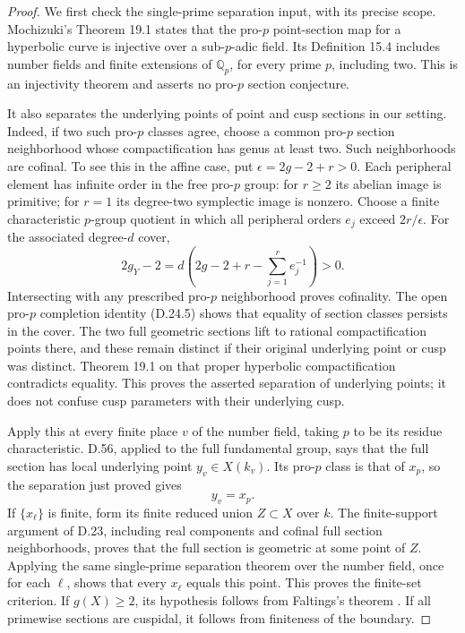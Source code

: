 \begin{proof}
We first check the single-prime separation
input, with its precise scope. Mochizuki's
Theorem 19.1 \cite{DE_Mochizuki1999} states
that the pro-\(p\) point-section map for a
hyperbolic curve is injective over a
sub-\(p\)-adic field. Its Definition 15.4
includes number fields and finite extensions
of \(\mathbb Q_p\), for every prime \(p\),
including two. This is an injectivity
theorem and asserts no pro-\(p\) section
conjecture.

It also separates the underlying points
of point and cusp sections in our setting.
Indeed, if two such pro-\(p\) classes agree,
choose a common pro-\(p\) section neighborhood
whose compactification has genus at least
two. Such neighborhoods are cofinal. To
see this in the affine case, put
\(\epsilon=2g-2+r>0\). Each peripheral
element has infinite order in the free
pro-\(p\) group: for \(r\ge2\) its
abelian image is primitive; for \(r=1\)
its degree-two symplectic image is nonzero.
Choose a finite characteristic \(p\)-group
quotient in which all peripheral orders
\(e_j\) exceed \(2r/\epsilon\). For the
associated degree-\(d\) cover,
\[
 2g_Y-2=d\left(2g-2+r-\sum_{j=1}^r e_j^{-1}\right)>0.
                                                               \tag{D.25.2}
\]
Intersecting with any prescribed pro-\(p\)
neighborhood proves cofinality. The open
pro-\(p\) completion identity (D.24.5)
shows that equality of section classes
persists in the cover. The two full
geometric sections lift to rational
compactification points there, and these
remain distinct if their original
underlying point or cusp was distinct.
Theorem 19.1 on that proper hyperbolic
compactification contradicts equality.
This proves the asserted separation of
underlying points; it does not confuse
cusp parameters with their underlying cusp.

Apply this at every finite place \(v\)
of the number field, taking \(p\) to be
its residue characteristic. D.56, applied to the full fundamental group, says
that the full section has local underlying
point \(y_v\in X(k_v)\). Its pro-\(p\)
class is that of \(x_p\), so the separation
just proved gives
\[
                         y_v=x_p.                \tag{D.25.3}
\]
If \(\{x_\ell\}\) is finite, form its
finite reduced union \(Z\subset X\) over
\(k\). The finite-support argument of
D.23, including real components and
cofinal full section neighborhoods,
proves that the full section is geometric
at some point of \(Z\). Applying the
same single-prime separation theorem over
the number field, once for each \(\ell\),
shows that every \(x_\ell\) equals this
point. This proves the finite-set criterion.
If \(g(X)\ge2\), its hypothesis follows
from Faltings's theorem
\cite[Satz 7]{DE_Faltings1983}. If all
primewise sections are cuspidal, it follows
from finiteness of the boundary.


\end{proof}

